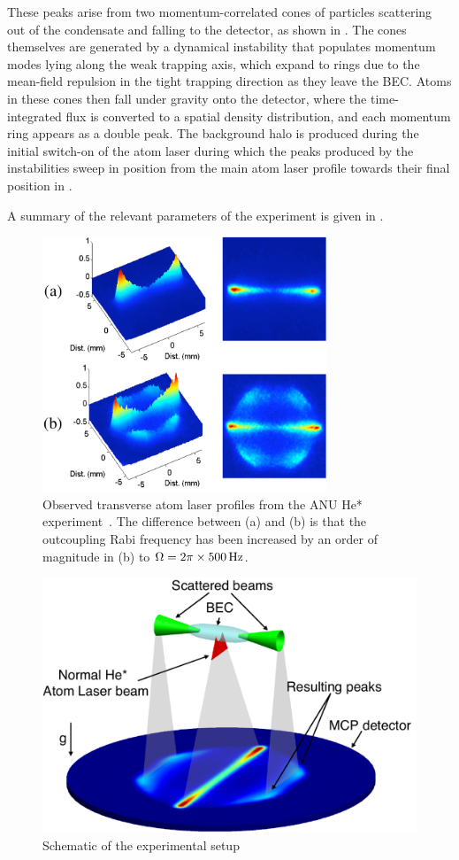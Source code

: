 These peaks arise from two momentum-correlated cones of particles scattering out of the condensate and falling to the detector, as shown in .  The cones themselves are generated by a dynamical instability that populates momentum modes lying along the weak trapping axis, which expand to rings due to the mean-field repulsion in the tight trapping direction as they leave the BEC.  Atoms in these cones then fall under gravity onto the detector, where the time-integrated flux is converted to a spatial density distribution, and each momentum ring appears as a double peak.  The background halo is produced during the initial switch-on of the atom laser during which the peaks produced by the instabilities sweep in position from the main atom laser profile towards their final position in .

A summary of the relevant parameters of the experiment is given in .

\begin{figure}
    \centering
        \includegraphics[height=3in]{ExperimentalResults}
    \caption{Observed transverse atom laser profiles from the ANU He* experiment~\citep{Dall:2009}.  The difference between (a) and (b) is that the outcoupling Rabi frequency has been increased by an order of magnitude in (b) to $\Omega = 2 \pi \times \unit[500]{Hz}$.}
    \label{Peaks:ExperimentalResults}
\end{figure}

\begin{figure}
    \centering
        \includegraphics[height=3in]{Schematic}
    \caption{Schematic of the experimental setup}
    \label{Peaks:Schematic}
\end{figure}


